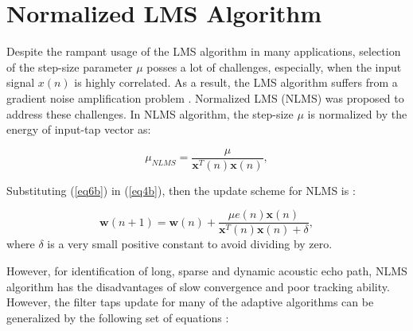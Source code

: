 \vspace{-0.3cm}
\section{Normalized LMS Algorithm}\label{sec:3.3}
\vspace{-0.5cm}
\noindent Despite the rampant usage of the LMS algorithm in many applications, selection of the step-size parameter $\mu$ posses a lot of challenges, especially, when the input signal $x(n)$ is highly correlated. As a result, the LMS algorithm suffers from a gradient noise amplification problem \cite{shukur}. Normalized LMS (NLMS) was proposed to address these challenges. In NLMS algorithm, the step-size $\mu$ is normalized by the energy of input-tap vector as:

\vspace{-1.5cm}
\begin{equation}
\mu_{NLMS}=\frac{\mu}{\textbf{x}^T(n)\textbf{x}(n)}, \label{eq6b}
\end{equation}

\vspace{-0.6cm}
\noindent Substituting (\ref{eq6b}) in (\ref{eq4b}), then the update scheme for NLMS is \cite{Duttweiler}:

\vspace{-1.5cm}
\begin{equation}
\textbf{w}(n+1)=\textbf{w}(n)+\frac{\mu e(n)\textbf{x}(n)}{\textbf{x}^{T}(n)\textbf{x}(n)+\delta}, \label{eq7b}
\end{equation}
\vspace{-0.6cm}
\noindent where $\delta$ is a very small positive constant to avoid dividing by zero.


\par
\noindent However, for identification of long, sparse and dynamic acoustic echo path, NLMS algorithm has the disadvantages of slow convergence and poor tracking ability. However, the filter taps update for many of the adaptive algorithms can be generalized by the following set of equations \cite{Mandic}:

